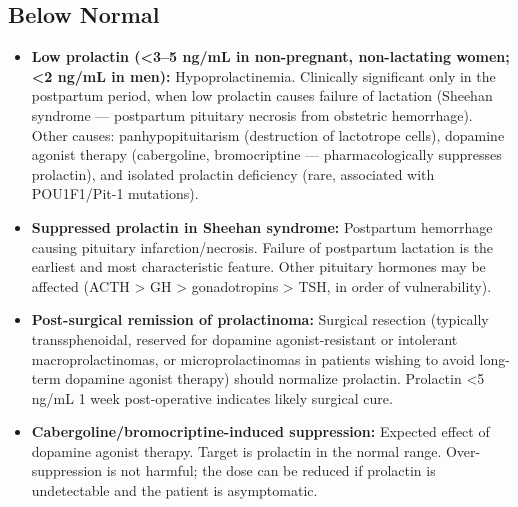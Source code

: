 \subsection*{Below Normal}
\begin{itemize}
  \item \textbf{Low prolactin (<3--5 ng/mL in non-pregnant, non-lactating women; <2 ng/mL in men):} Hypoprolactinemia. Clinically significant only in the postpartum period, when low prolactin causes failure of lactation (Sheehan syndrome --- postpartum pituitary necrosis from obstetric hemorrhage). Other causes: panhypopituitarism (destruction of lactotrope cells), dopamine agonist therapy (cabergoline, bromocriptine --- pharmacologically suppresses prolactin), and isolated prolactin deficiency (rare, associated with POU1F1/Pit-1 mutations).
  \item \textbf{Suppressed prolactin in Sheehan syndrome:} Postpartum hemorrhage causing pituitary infarction/necrosis. Failure of postpartum lactation is the earliest and most characteristic feature. Other pituitary hormones may be affected (ACTH > GH > gonadotropins > TSH, in order of vulnerability).
  \item \textbf{Post-surgical remission of prolactinoma:} Surgical resection (typically transsphenoidal, reserved for dopamine agonist-resistant or intolerant macroprolactinomas, or microprolactinomas in patients wishing to avoid long-term dopamine agonist therapy) should normalize prolactin. Prolactin <5 ng/mL 1 week post-operative indicates likely surgical cure.
  \item \textbf{Cabergoline/bromocriptine-induced suppression:} Expected effect of dopamine agonist therapy. Target is prolactin in the normal range. Over-suppression is not harmful; the dose can be reduced if prolactin is undetectable and the patient is asymptomatic.
\end{itemize}

